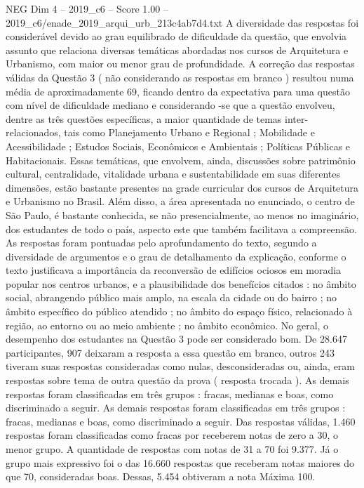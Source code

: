 \begin{textsample}{NEG Dim 4 – 2019\_c6 – Score 1.00 – 2019\_c6/enade\_2019\_arqui\_urb\_213c4ab7d4.txt}
A diversidade das respostas foi considerável devido ao grau equilibrado de dificuldade da questão, que envolvia assunto que relaciona diversas temáticas abordadas nos cursos de Arquitetura e Urbanismo, com maior ou menor grau de profundidade.
A correção das respostas válidas da Questão 3 ( não considerando as respostas em branco ) resultou numa média de aproximadamente 69, ficando dentro da expectativa para uma questão com nível de dificuldade mediano e considerando -se que a questão envolveu, dentre as três questões específicas, a maior quantidade de temas inter-relacionados, tais como Planejamento Urbano e Regional ; Mobilidade e Acessibilidade ; Estudos Sociais, Econômicos e Ambientais ; Políticas Públicas e Habitacionais.
Essas temáticas, que envolvem, ainda, discussões sobre patrimônio cultural, centralidade, vitalidade urbana e sustentabilidade em suas diferentes dimensões, estão bastante presentes na grade curricular dos cursos de Arquitetura e Urbanismo no Brasil.
Além disso, a área apresentada no enunciado, o centro de São Paulo, é bastante conhecida, se não presencialmente, ao menos no imaginário, dos estudantes de todo o país, aspecto este que também facilitava a compreensão.
As respostas foram pontuadas pelo aprofundamento do texto, segundo a diversidade de argumentos e o grau de detalhamento da explicação, conforme o texto justificava a importância da reconversão de edifícios ociosos em moradia popular nos centros urbanos, e a plausibilidade dos benefícios citados : no âmbito social, abrangendo público mais amplo, na escala da cidade ou do bairro ; no âmbito específico do público atendido ; no âmbito do espaço físico, relacionado à região, ao entorno ou ao meio ambiente ; no âmbito econômico.
No geral, o desempenho dos estudantes na Questão 3 pode ser considerado bom.
De 28.647 participantes, 907 deixaram a resposta a essa questão em branco, outros 243 tiveram suas respostas consideradas como nulas, desconsideradas ou, ainda, eram respostas sobre tema de outra questão da prova ( resposta trocada ).
As demais respostas foram classificadas em três grupos : fracas, medianas e boas, como discriminado a seguir.
As demais respostas foram classificadas em três grupos : fracas, medianas e boas, como discriminado a seguir.
Das respostas válidas, 1.460 respostas foram classificadas como fracas por receberem notas de zero a 30, o menor grupo.
A quantidade de respostas com notas de 31 a 70 foi 9.377.
Já o grupo mais expressivo foi o das 16.660 respostas que receberam notas maiores do que 70, consideradas boas.
Dessas, 5.454 obtiveram a nota Máxima 100.

\end{textsample}
